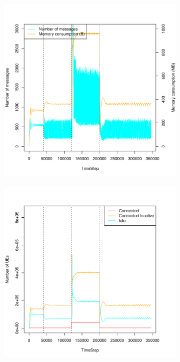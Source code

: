 \documentclass[a4j]{ujarticle}
\begin{document}
\begin{figure}[htbp]
\begin{subfigure}{0.49\hsize}
   \centering
   \includegraphics[width=1.0\hsize]{scenario_7_signaling_and_memoryload_vs_timeStep_0_691200_1-35_0-000203_0_0_shortFrequency_addIn100s_random.pdf}
   \label{subfig:scenario_7_signaling_and_memoryload_vs_timeStep_0_691200_1-35_0-000203_0_0_shortFrequency_addIn100s_random}
 \end{subfigure}
 \begin{subfigure}{0.49\hsize}
   \centering
   \includegraphics[width=1.0\hsize]{scenario_7_stateBreakdown_0_691200_1-35_0-000203_0_0_shortFrequency_addIn100s_random.pdf}

\end{subfigure}
\end{figure}
\end{document}
